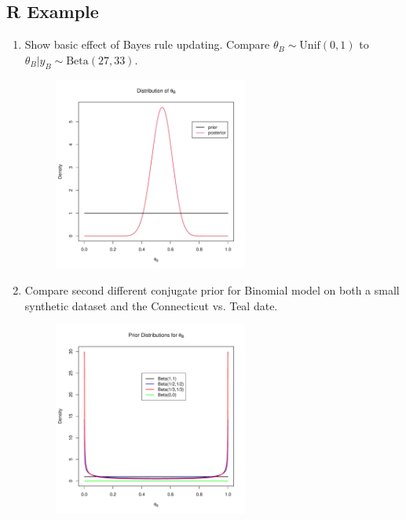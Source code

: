 \subsection{R Example}
\begin{enumerate}
    \item Show basic effect of Bayes rule updating. Compare $\theta_B \sim \text{Unif}(0, 1)$ to $\theta_B | y_B \sim \text{Beta}(27, 33)$.
    \begin{figure}[H]
    	\centering
    	\includegraphics[width=0.6\textwidth]{../R/fig/fig1.pdf}
    \end{figure}
    \item Compare second different conjugate prior for Binomial model on both a small synthetic dataset and the Connecticut vs. Teal date.
    \begin{figure}[H]
    	\centering
    	\includegraphics[width=0.6\textwidth]{../R/fig/fig2.pdf}
    \end{figure}
    \begin{figure}[H]
    	\centering

\end{figure}
\end{enumerate}
